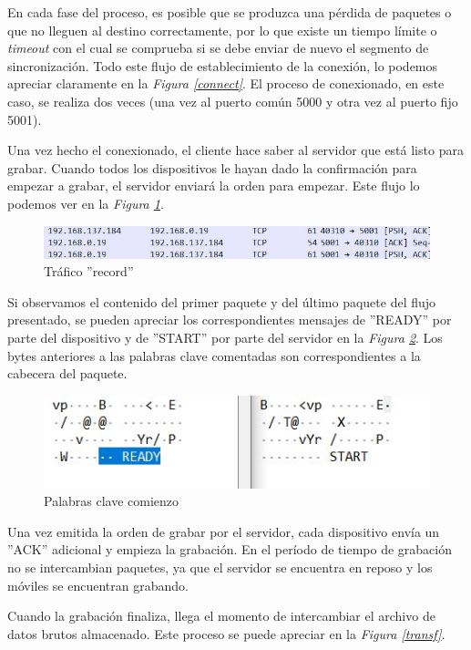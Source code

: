 \documentclass[a4paper,11pt]{book}
\begin{document}
En cada fase del proceso, es posible que se produzca una pérdida de paquetes o que no lleguen al destino correctamente, por lo que existe un tiempo límite o \textit{timeout} con el cual se comprueba si se debe enviar de nuevo el segmento de sincronización. Todo este flujo de establecimiento de la conexión, lo podemos apreciar claramente en la \textit{Figura \ref{connect}}. El proceso de conexionado, en este caso, se realiza dos veces (una vez al puerto común 5000 y otra vez al puerto fijo 5001).

Una vez hecho el conexionado, el cliente hace saber al servidor que está listo para grabar. Cuando todos los dispositivos le hayan dado la confirmación para empezar a grabar, el servidor enviará la orden para empezar. Este flujo lo podemos ver en la \textit{Figura \ref{record}}.

\begin{figure}[hbtp]
\centering
\includegraphics[width = 12 cm]{FIGURAS/trafico_record.JPG}
\caption{Tráfico ''record''}
\label{record}
\end{figure}

Si observamos el contenido del primer paquete y del último paquete del flujo presentado, se pueden apreciar los correspondientes mensajes de ''READY'' por parte del dispositivo y de ''START'' por parte del servidor en la \textit{Figura \ref{mensajes}}. Los bytes anteriores a las palabras clave comentadas son correspondientes a la cabecera del paquete.

\begin{figure}[hbtp]
\centering
\includegraphics[width = 8 cm]{FIGURAS/startready.JPG}
\caption{Palabras clave comienzo}
\label{mensajes}
\end{figure}

Una vez emitida la orden de grabar por el servidor, cada dispositivo envía un ''ACK'' adicional y empieza la grabación. En el período de tiempo de grabación no se intercambian paquetes, ya que el servidor se encuentra en reposo y los móviles se encuentran grabando.

Cuando la grabación finaliza, llega el momento de intercambiar el archivo de datos brutos almacenado. Este proceso se puede apreciar en la \textit{Figura \ref{transf}}.
\end{document}
